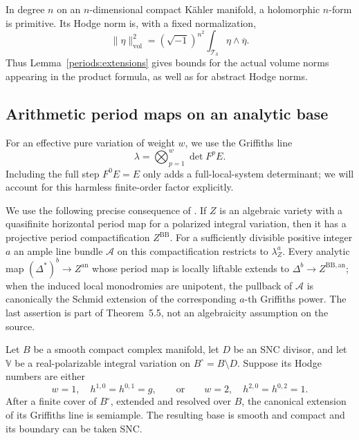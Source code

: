 In degree $n$ on an $n$-dimensional compact K\"ahler manifold, a
holomorphic $n$-form is primitive.  Its Hodge norm is, with a fixed
normalization,
\begin{equation}\label{periods:volume}
 \|\eta\|_{\mathrm{vol}}^2
   =(\sqrt{-1})^{n^2}\int_{\mathcal T_b}\eta\wedge\overline\eta.
\end{equation}
Thus Lemma~\ref{periods:extensions} gives bounds for the actual volume norms
appearing in the product formula, as well as for abstract Hodge norms.

\subsection{Arithmetic period maps on an analytic base}

For an effective pure variation of weight $w$, we use
the Griffiths line
\[
 \lambda=\bigotimes_{p=1}^{w}\det F^pE.
\]
Including the full step $F^0E=E$ only adds a full-local-system determinant;
we will account for this harmless finite-order factor explicitly.

We use the following precise consequence of
\cite[Theorems~5.2 and~5.5]{BFMT25}.  If $Z$ is an algebraic variety with
a quasifinite horizontal period map for a polarized integral variation,
then it has a projective period compactification $Z^{\mathrm{BB}}$.
For a sufficiently divisible positive integer $a$ an ample line bundle
$\mathcal A$ on this compactification restricts to $\lambda_Z^a$.
Every analytic map $(\Delta^*)^b\to Z^{\mathrm{an}}$ whose period map is
locally liftable extends to $\Delta^b\to Z^{\mathrm{BB},\mathrm{an}}$;
when the induced local monodromies are unipotent, the pullback of
$\mathcal A$ is canonically the Schmid extension of the corresponding
$a$-th Griffiths power.  The last assertion is part of Theorem~5.5, not an
algebraicity assumption on the source.

\begin{lemma}
\label{periods:griffiths}
Let $B$ be a smooth compact complex manifold, let $D$ be an SNC divisor,
and let $\mathbb V$ be a real-polarizable integral variation on
$B^\circ=B\setminus D$.  Suppose its Hodge numbers are either
\[
  w=1,\quad h^{1,0}=h^{0,1}=g,
  \qquad\text{or}\qquad
  w=2,\quad h^{2,0}=h^{0,2}=1.
\]
After a finite cover of $B^\circ$, extended and resolved over $B$, the
canonical extension of its Griffiths line is semiample.  The resulting
base is smooth and compact and its boundary can be taken SNC.
\end{lemma}

